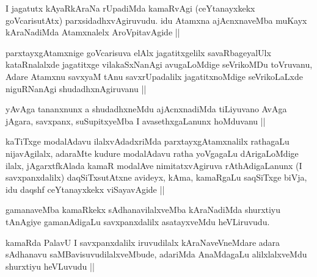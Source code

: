 
\begin{artha}
I jagatutx kAyaRkAraNa rUpadiMda kamaRvAgi (ceYtanayxkekx goVcarisutAtx) parxsidadhxvAgiruvudu. idu Atamxna ajAcnxnaveMba muKayx kAraNadiMda Atamxnalelx AroVpitavAgide ||
\end{artha}


\begin{artha}
parxtayxgAtamxnige goVcarisuva elAlx jagatitxgelilx savaRbageyalUlx kataRnalalxde jagatitxge vilakaSxNanAgi avugaLoMdige seVrikoMDu toVruvanu, Adare Atamxnu savxyaM tAnu savxrUpadalilx jagatitxnoMdige seVrikoLaLxde niguRNanAgi shudadhxnAgiruvanu ||
\end{artha}


\begin{artha}
yAvAga tananxnunx a shudadhxneMdu ajAcnxnadiMda tiLiyuvano AvAga jAgara, savxpanx, suSupitxyeMba I avasethxgaLanunx hoMduvanu ||
\end{artha}


\begin{artha}
kaTiTxge modalAdavu ilalxvAdadxriMda parxtayxgAtamxnalilx rathagaLu nijavAgilalx, adaraMte kudure modalAdavu ratha yoVgagaLu dArigaLoMdige ilalx, jAgarxtfkAlada kamaR modalAve nimitatxvAgiruva rAthAdigaLanunx (I savxpanxdalilx) daqSiTxsutAtxne avideyx, kAma, kamaRgaLu saqSiTxge biVja, idu daqshf ceYtanayxkekx viSayavAgide ||
\end{artha}


\begin{artha}
gamanaveMba kamaRkekx sAdhanavilalxveMba kAraNadiMda shurxtiyu tAnAgiye gamanAdigaLu savxpanxdalilx asatayxveMdu heVLiruvudu.
\end{artha}


\begin{artha}
kamaRda PalavU I savxpanxdalilx iruvudilalx kAraNaveVneMdare adara sAdhanavu saMBavisuvudilalxveMbude, adariMda AnaMdagaLu alilxlalxveMdu shurxtiyu heVLuvudu ||
\end{artha}

